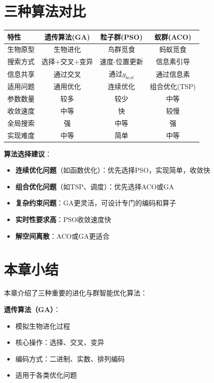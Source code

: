 
\section{三种算法对比}

\begin{table}[htbp]
\centering\small
\begin{tabular}{lccc}
\toprule
\textbf{特性} & \textbf{遗传算法(GA)} & \textbf{粒子群(PSO)} & \textbf{蚁群(ACO)} \\
\midrule
生物原型 & 生物进化 & 鸟群觅食 & 蚂蚁觅食 \\
搜索方式 & 选择+交叉+变异 & 速度-位置更新 & 信息素引导 \\
信息共享 & 通过交叉 & 通过$g_{best}$ & 通过信息素 \\
适用问题 & 通用优化 & 连续优化 & 组合优化(TSP) \\
参数数量 & 较多 & 较少 & 中等 \\
收敛速度 & 中等 & 快 & 较慢 \\
全局搜索 & 强 & 中等 & 强 \\
实现难度 & 中等 & 简单 & 中等 \\
\bottomrule
\end{tabular}
\end{table}

\begin{tipbox}
\textbf{算法选择建议}：
\begin{itemize}[itemsep=0pt]
    \item \textbf{连续优化问题}（如函数优化）：优先选择PSO，实现简单，收敛快
    \item \textbf{组合优化问题}（如TSP、调度）：优先选择ACO或GA
    \item \textbf{复杂约束问题}：GA更灵活，可设计专门的编码和算子
    \item \textbf{实时性要求高}：PSO收敛速度快
    \item \textbf{解空间离散}：ACO或GA更适合
\end{itemize}
\end{tipbox}

\section{本章小结}

本章介绍了三种重要的进化与群智能优化算法：

\textbf{遗传算法（GA）}：
\begin{itemize}[leftmargin=2em,itemsep=0pt]
    \item 模拟生物进化过程
    \item 核心操作：选择、交叉、变异
    \item 编码方式：二进制、实数、排列编码
    \item 适用于各类优化问题
\end{itemize}

